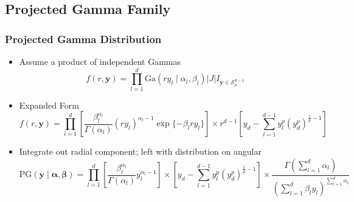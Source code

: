 \documentclass[aspectratio=169]{beamer}
\begin{document}
\subsection{Projected Gamma Family}
\begin{frame}
  \frametitle{Projected Gamma Distribution}
  \begin{itemize}
    \item Assume a product of independent Gammas
      \begin{equation*}
        f(r,\bm{y}) = \prod_{l = 1}^d \text{Ga}\left(ry_l\mid\alpha_l,\beta_l\right)
        \lvert J \rvert I_{\bm{y} \in \mathcal{S}_{p}^{d-1}}
      \end{equation*}
    \pause
    \item Expanded Form
      \begin{equation*}
        f(r,\bm{ y}) = \prod_{l = 1}^{d}
        \left[\frac{\beta_l^{\alpha_l}}{\Gamma(\alpha_l)}(ry_l)^{\alpha_l - 1}
                    \exp\lbrace-\beta_lry_l\rbrace\right]
        \times r^{d-1}\left[y_d - {\textstyle \sum}_{l = 1}^{d-1}y_l^p
                  \left(y_d^p\right)^{\frac{1}{p} - 1}\right]
      \end{equation*}
    \pause
    \item Integrate out radial component; left with distribution on angular
      \begin{equation*}
        \text{PG}(\bm{ y}\mid\bm{ \alpha},\bm{ \beta}) = \prod_{l = 1}^d\left[\frac{\beta_l^{\alpha_l}}{\Gamma(\alpha_l)}y_l^{\alpha_l - 1}\right]
          \times \left[y_d - {\textstyle \sum}_{l = 1}^{d-1}y_l^p\left(y_d^p\right)^{\frac{1}{p} - 1}\right]
          \times \frac{\Gamma({\textstyle\sum}_{l = 1}^d\alpha_l)}{\left({\textstyle\sum}_{l = 1}^d \beta_ly_l\right)^{{\scriptstyle\sum_{l = 1}^d \alpha_l}}}
      \end{equation*}
  \end{itemize}
\end{frame} %
\end{document}
